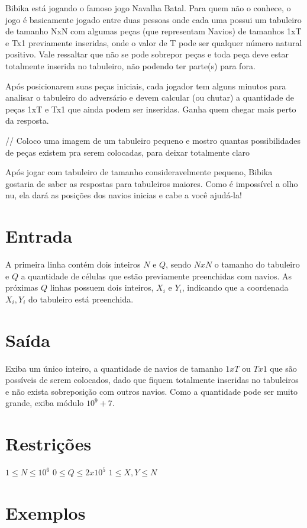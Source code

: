 Bibika está jogando o famoso jogo Navalha Batal. Para quem não o conhece, o jogo é basicamente jogado entre duas pessoas onde cada uma possui um tabuleiro de tamanho NxN com algumas peças (que representam Navios) de tamanhos 1xT e Tx1 previamente inseridas, onde o valor de T pode ser qualquer número natural positivo. Vale ressaltar que não se pode sobrepor peças e toda peça deve estar totalmente inserida no tabuleiro, não podendo ter parte(s) para fora. 

Após posicionarem suas peças iniciais, cada jogador tem alguns minutos para analisar o tabuleiro do adversário e devem calcular (ou chutar) a quantidade de peças 1xT e Tx1 que ainda podem ser inseridas. Ganha quem chegar mais perto da resposta.

// Coloco uma imagem de um tabuleiro pequeno e mostro quantas possibilidades de peças existem pra serem colocadas, para deixar totalmente claro 

Após jogar com tabuleiro de tamanho consideravelmente pequeno, Bibika gostaria de saber as respostas para tabuleiros maiores. Como é impossível a olho nu, ela dará as posições dos navios inicias e cabe a você ajudá-la!

\section*{Entrada}

A primeira linha contém dois inteiros $N$ e $Q$, sendo $NxN$ o tamanho do tabuleiro e $Q$ a quantidade de células que estão previamente preenchidas com navios.
As próximas $Q$ linhas possuem dois inteiros, $X_i$ e $Y_i$, indicando que a coordenada $X_i, Y_i$ do tabuleiro está preenchida.

\section*{Saída}

Exiba um único inteiro, a quantidade de navios de tamanho $1xT$ ou $Tx1$ que são possíveis de serem colocados, dado que fiquem totalmente inseridas no tabuleiros e não exista sobreposição com outros navios. Como a quantidade pode ser muito grande, exiba módulo $10^9+7$.

\section*{Restrições}

$1 \leq N \leq 10^6$
$0 \leq Q \leq 2x10^5$
$1 \leq X, Y \leq N$

\section*{Exemplos}
\exemplo
